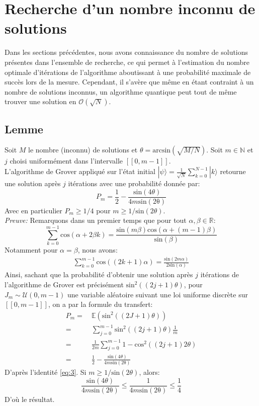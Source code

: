 \section{Recherche d'un nombre inconnu de solutions}
\label{part3}

Dans les sections précédentes, nous avons connaissance du nombre de solutions présentes dans l'ensemble de recherche, ce qui permet à l'estimation du nombre optimale d'itérations de l'algorithme aboutissant à une probabilité maximale de succès lors de la mesure. Cependant, il s'avère que même en étant contraint à un nombre de solutions inconnus, un algorithme quantique peut tout de même trouver une solution en $\mathcal{O}(\sqrt{N})$. \cite{brassard2002quantum}

\subsection{Lemme}
\label{Lemme}

Soit $M$ le nombre (inconnu) de solutions et $\theta = \mathrm{arcsin}(\sqrt{M/N})$. Soit $m \in \mathbb{N}$ et $j$ choisi uniformément dans l'intervalle $[\![0, m-1]\!]$.
\\
L'algorithme de Grover appliqué sur l'état initial $| \psi \rangle = \frac{1}{\sqrt{N}} \sum_{k=0}^{N-1} |k\rangle$ retourne une solution après $j$ itérations avec une probabilité donnée par:
\[P_m = \frac{1}{2} - \frac{\mathrm{sin}(4\theta)}{4m\mathrm{sin(2\theta)}}\]
Avec en particulier $P_m \geq 1/4$ pour $m \geq 1/\mathrm{sin}(2\theta)$.
\\
\textit{Preuve:} Remarquons dans un premier temps que pour tout $\alpha, \beta \in \mathbb{R}$:
\[ \sum_{k=0}^{m-1}\mathrm{cos}(\alpha + 2\beta k) = \frac{\mathrm{sin}(m\beta)\mathrm{cos}(\alpha+(m-1)\beta)}{\mathrm{sin}(\beta)}\]
Notamment pour $\alpha=\beta$, nous avons:
\begin{align}
\sum_{k=0}^{m-1}\mathrm{cos}((2k+1)\alpha) = \frac{\mathrm{sin}(2m\alpha)}{2\mathrm{sin}(\alpha)}
\label{eq:3}
\end{align}
Ainsi, sachant que la probabilité d'obtenir une solution après $j$ itérations de l'algorithme de Grover est précisément $\mathrm{sin}^2((2j+1)\theta)$, pour $J_m \sim \mathcal{U}(0,m-1)$ une variable aléatoire suivant une loi uniforme discrète sur $[\![0,m-1]\!]$, on a par la formule du transfert:
\begin{align*}
P_m =&\ \mathbb{E}(\mathrm{sin}^2((2J+1)\theta)) \\
=&\ \sum_{j=0}^{m-1}\mathrm{sin}^2((2j+1)\theta) \frac{1}{m} \\
=&\ \frac{1}{2m} \sum_{j=0}^{m-1}1 - \mathrm{cos}^2((2j+1)2\theta) \\
=&\ \frac{1}{2} - \frac{\mathrm{sin}(4\theta)}{4m\mathrm{sin(2\theta)}}
\end{align*}
D'après l'identité \eqref{eq:3}. Si $m \geq 1/\mathrm{sin}(2\theta)$, alors:
\[\frac{\mathrm{sin}(4\theta)}{4m\mathrm{sin(2\theta)}} \leq \frac{1}{4m\mathrm{sin(2\theta)}} \leq \frac{1}{4}\]
D'où le résultat.

